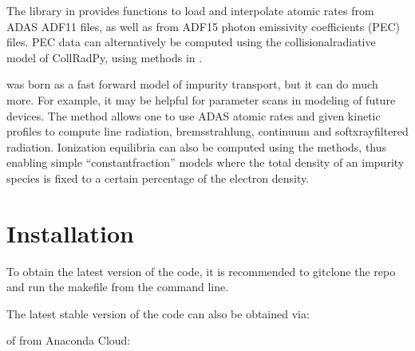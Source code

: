 \documentclass[letterpaper,10pt,english]{sphinxmanual}
\begin{document}
The library in {\hyperref[\detokenize{aurora:module-aurora.atomic}]{}} provides functions to load and interpolate atomic rates from ADAS ADF\sphinxhyphen{}11 files, as well as from ADF\sphinxhyphen{}15 photon emissivity coefficients (PEC) files. PEC data can alternatively be computed using the collisional\sphinxhyphen{}radiative model of CollRadPy, using methods in {\hyperref[\detokenize{aurora:module-aurora.radiation}]{}}.

{\hyperref[\detokenize{aurora:module-aurora}]{}} was born as a fast forward model of impurity transport, but it can do much more. For example, it may be helpful for parameter scans in modeling of future devices. The {\hyperref[\detokenize{aurora:aurora.radiation.radiation_model}]{}} method allows one to use ADAS atomic rates and given kinetic profiles to compute line radiation, bremsstrahlung, continuum and soft\sphinxhyphen{}x\sphinxhyphen{}ray\sphinxhyphen{}filtered radiation. Ionization equilibria can also be computed using the {\hyperref[\detokenize{aurora:module-aurora.atomic}]{}} methods, thus enabling simple “constant\sphinxhyphen{}fraction” models where the total density of an impurity species is fixed to a certain percentage of the electron density.


\chapter{Installation}
\label{\detokenize{index:installation}}
To obtain the latest version of the code, it is recommended to git\sphinxhyphen{}clone the repo
and run the makefile from the command line.

The latest stable version of the code can also be obtained via:

\begin{sphinxVerbatim}[commandchars=\\\{\}]
  
\end{sphinxVerbatim}

of from Anaconda Cloud:

\begin{sphinxVerbatim}[commandchars=\\\{\}]
  
\end{sphinxVerbatim}
\end{document}
